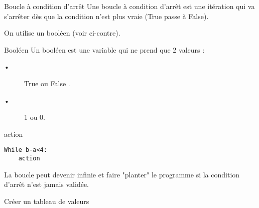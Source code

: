 \begin{minipage}{0.5\linewidth}
\begin{DefT}{Boucle à condition d'arrêt}
Une boucle à condition d'arrêt est une itération qui va s'arrêter dès que la condition n'est plus vraie (\color{orange}True\color{black} passe à \color{orange}False\color{black}). 

On utilise un booléen (voir ci-contre).
\end{DefT}
\end{minipage}
\begin{minipage}{0.5\linewidth}
\begin{DefT}{Booléen}
Un booléen est une variable qui ne prend que 2 valeurs : 
\begin{description}
\item[•] \color{orange}True\color{black} \quad ou \quad \color{orange}False \color{black}.
\item[•] 1 ou 0.
\end{description}
\end{DefT}
\end{minipage}

\begin{Syn}
\begin{minipage}[t]{0.49\linewidth}
\begin{algobox}
\DebutTantQue
\Ligne action
\FinTantQue
\end{algobox}

\end{minipage}
\hfill\vrule\hfill
\begin{minipage}[t]{0.49\linewidth}
\begin{lstlisting}
While b-a<4:
	action
\end{lstlisting}
\end{minipage}
\end{Syn}

\begin{Att}
La boucle peut devenir infinie et faire "planter" le programme si la condition d'arrêt n'est jamais validée.
\end{Att}


\begin{ExC}{Créer un tableau de valeurs}
 
\end{ExC}



